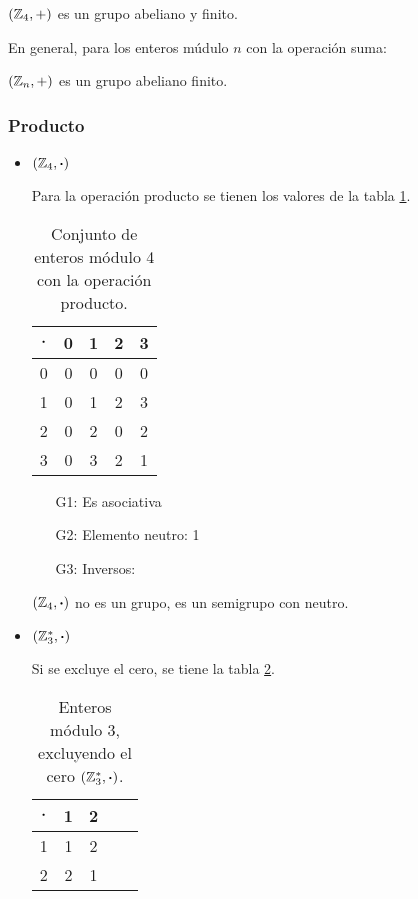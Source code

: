 \begin{center}
	$(\mathbb{Z}_4, +)$ es un grupo abeliano y finito.
\end{center}

En general, para los enteros múdulo $n$ con la operación suma:
\begin{center}
	$(\mathbb{Z}_n, +)$ es un grupo abeliano finito.
\end{center}

\subsubsection{Producto}

\begin{itemize}
	\item $(\mathbb{Z}_4, \boldsymbol{\cdot})$
	
	Para la operación producto se tienen los valores de la tabla \ref{tab:mod4p}.
	\begin{table}[H]
		\centering
		\begin{tabular}{c|cccc}
			$\boldsymbol{\cdot}$ & 0 & 1 & 2 & 3\\
			\hline
			0 & 0 & 0 & 0 & 0\\
			1 & 0 & 1 & 2 & 3\\
			2 & 0 & 2 & 0 & 2\\
			3 & 0 & 3 & 2 & 1\\
		\end{tabular}
		\caption{Conjunto de enteros módulo 4 con la operación producto.}
		\label{tab:mod4p}
	\end{table}
	
	\begin{itemize}
		\item[G1:] Es asociativa \cmark
		\item[G2:] Elemento neutro: 1 \cmark
		\item[G3:] Inversos: \xmark
	\end{itemize}
	
	\begin{center}
		$(\mathbb{Z}_4, \boldsymbol{\cdot})$ no es un grupo, es un semigrupo con neutro.
	\end{center}
	
		\item $(\mathbb{Z}^{*}_3, \boldsymbol{\cdot})$
	
	Si se excluye el cero, se tiene la tabla \ref{tab:mod3pa}.
	
	\begin{table}[H]
		\centering
		\begin{tabular}{c|cccc}
			$\boldsymbol{\cdot}$ & 1 & 2\\
			\hline
			1 & 1 & 2 \\
			2 & 2 & 1\\
		\end{tabular}
		\caption{Enteros módulo 3, excluyendo el cero $(\mathbb{Z}^{*}_3, \boldsymbol{\cdot})$.}
		\label{tab:mod3pa}
	\end{table}
	

\end{itemize}
